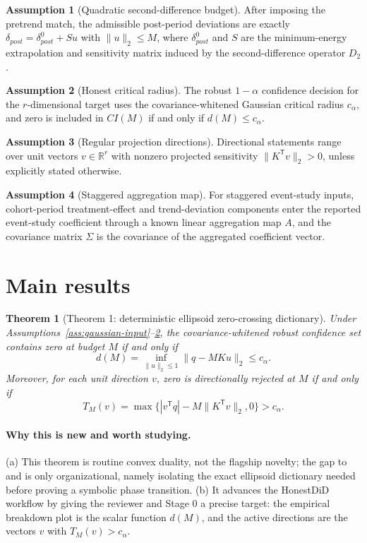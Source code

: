 \documentclass[11pt]{article}
\newcommand{\transpose}{\mathsf{T}}
\newcommand{\R}{\mathbb{R}}
\theoremstyle{definition}
\newtheorem{assumption}{Assumption}
\theoremstyle{plain}
\newtheorem{theorem}{Theorem}
\theoremstyle{remark}
\begin{document}
\begin{assumption}[Quadratic second-difference budget]\label{ass:quadratic-budget}
After imposing the pretrend match, the admissible post-period deviations are exactly
\(\delta_{post}=\delta^0_{post}+S u\) with \(\|u\|_2\le M\), where \(\delta^0_{post}\) and \(S\) are the minimum-energy extrapolation and sensitivity matrix induced by the second-difference operator \(D_2\).
\end{assumption}

\begin{assumption}[Honest critical radius]\label{ass:critical-radius}
The robust \(1-\alpha\) confidence decision for the \(r\)-dimensional target uses the covariance-whitened Gaussian critical radius \(c_\alpha\), and zero is included in \(CI(M)\) if and only if \(d(M)\le c_\alpha\).
\end{assumption}

\begin{assumption}[Regular projection directions]\label{ass:regular-directions}
Directional statements range over unit vectors \(v\in\R^r\) with nonzero projected sensitivity \(\|K^\transpose v\|_2>0\), unless explicitly stated otherwise.
\end{assumption}

\begin{assumption}[Staggered aggregation map]\label{ass:aggregation-map}
For staggered event-study inputs, cohort-period treatment-effect and trend-deviation components enter the reported event-study coefficient through a known linear aggregation map \(A\), and the covariance matrix \(\Sigma\) is the covariance of the aggregated coefficient vector.
\end{assumption}

\section{Main results}
\begin{theorem}[Theorem 1: deterministic ellipsoid zero-crossing dictionary]\label{thm:ellipsoid-dictionary}
Under Assumptions~\ref{ass:gaussian-input}--\ref{ass:critical-radius}, the covariance-whitened robust confidence set contains zero at budget \(M\) if and only if
\[
  d(M)=\inf_{\|u\|_2\le1}\|q-MKu\|_2\le c_\alpha.
\]
Moreover, for each unit direction \(v\), zero is directionally rejected at \(M\) if and only if
\[
  T_M(v)=\max\{|v^\transpose q|-M\|K^\transpose v\|_2,0\}>c_\alpha.
\]
\end{theorem}
\paragraph{Why this is new and worth studying.}
(a) This theorem is routine convex duality, not the flagship novelty; the gap to \citet{rambachan2023parallel} and \citet{andrews2023linear} is only organizational, namely isolating the exact ellipsoid dictionary needed before proving a symbolic phase transition.
(b) It advances the HonestDiD workflow by giving the reviewer and Stage 0 a precise target: the empirical breakdown plot is the scalar function \(d(M)\), and the active directions are the vectors \(v\) with \(T_M(v)>c_\alpha\).
\end{document}
